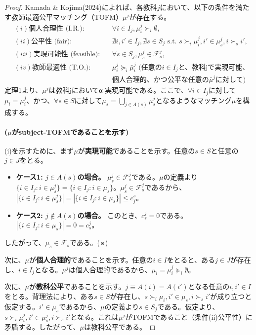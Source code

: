 \documentclass[12pt, a4paper]{article}
\theoremstyle{definition}
\theoremstyle{remark}
\theoremstyle{plain}
\begin{document}
\begin{proof}
Kamada \& Kojima(2024)によれば、各教科$j$において、以下の条件を満たす教師最適公平マッチング（TOFM）$\mu^j$が存在する。
\begin{align*}
 &(i) \text{個人合理性 (I.R.)}: && \forall i \in I_j, \mu^j_i \succ_i \emptyset,\\
 &(ii) \text{公平性 (fair)}:  && \nexists i, i' \in I_j, \nexists s \in S_j \text{ s.t. } s \succ_i \mu^j_i, i' \in \mu^j_s, i \succ_s i',\\
 &(iii) \text{実現可能性 (feasible)}:  && \forall s \in S_j, \mu^j_s \in \mathcal{F}^j_s,\\
 &(iv) \text{教師最適性 (T.O.)}: && \mu^j_i \succeq_i \bar{\mu}^j_i \text{ (任意の$i \in I_j$と、教科jで実現可能、}\\
 & && \text{個人合理的、かつ公平な任意の$\bar{\mu}^j$に対して)}
\end{align*}
定理1より、$\mu^j$は教科jにおいてα-実現可能である。ここで、$\forall i \in I_j$に対して$\mu_i=\mu^j_i$、かつ、$\forall s \in S$に対して$\mu_s = \bigcup\limits_{j \in A(s)} \mu^j_s$となるようなマッチング$\mu$を構成する。

\paragraph{($\mu$がsubject-TOFMであることを示す)}
(i)を示すために、まず$\mu$が\textbf{実現可能}であることを示す。任意の$s \in S$と任意の$j \in J$をとる。
\begin{itemize}
    \item \textbf{ケース1: $j \in A(s)$の場合。} $\mu^j_s \in \mathcal{F}^j_s$である。$\mu$の定義より$\{i \in I_j : i \in \mu^j_s\} = \{ i \in I_j : i\in \mu_s \}$。$\mu^j_s \in \mathcal{F}^j_s$であるから、$|\{i \in I_j : i \in \mu^j_s\}| = |\{ i \in I_j : i\in \mu_s \}| \leq c_j^s$。
    \item \textbf{ケース2: $j \notin A(s)$の場合。} このとき、$c^j_s=0$である。$|\{i \in I_j : i \in \mu_s\}|= 0 = c^j_s$。
\end{itemize}
したがって、$\mu_s \in \mathcal{F}_s$である。(※)

次に、$\mu$が\textbf{個人合理的}であることを示す。任意の$i \in I$をとると、ある$j \in J$が存在し、$i \in I_j$となる。$\mu^j$は個人合理的であるから、$\mu_i = \mu^j_i \succeq_i \emptyset$。

次に、$\mu$が\textbf{教科公平}であることを示す。$j \equiv A(i) = A(i')$となる任意の$i,i' \in I$をとる。背理法により、ある$s \in S$が存在し、$s \succ_i \mu_i, i' \in \mu_s, i \succ_s i'$が成り立つと仮定する。$i' \in \mu_s$であるから、$\mu$の定義より$s \in S_j$である。仮定より、$s \succ_i \mu^j_i, i' \in \mu^j_s, i \succ_s i'$となる。これは$\mu^j$がTOFMであること（条件(ii)公平性）に矛盾する。したがって、$\mu$は教科公平である。



\end{proof}
\end{document}
